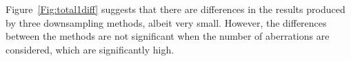 Figure~\ref{Fig:total1diff} suggests that there are differences in the results produced by three downsampling methods, albeit very small. However, the differences between the methods are not significant when the number of aberrations are considered, which are significantly high.


% 
% 
% 
% 
% 


